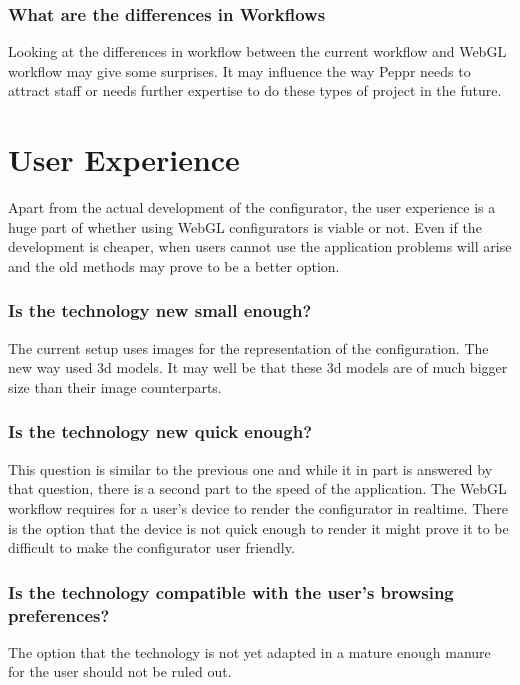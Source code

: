 \subsubsection {What are the differences in Workflows}
Looking at the differences in workflow between the current workflow and WebGL workflow may give some surprises. It may influence the way Peppr needs to attract staff or needs further expertise to do these types of project in the future.

\section{User Experience}
Apart from the actual development of the configurator, the user experience is a huge part of whether using WebGL configurators is viable or not. Even if the development is cheaper, when users cannot use the application problems will arise and the old methods may prove to be a better option.
\subsubsection {Is the technology new small enough?}
The current setup uses images for the representation of the configuration. The new way used 3d models. It may well be that these 3d models are of much bigger size than their image counterparts.

\subsubsection {Is the technology new quick enough?}
This question is similar to the previous one and while it in part is answered by that question, there is a second part to the speed of the application. The WebGL workflow requires for a user's device to render the configurator in realtime. There is the option that the device is not quick enough to render it might prove it to be difficult to make the configurator user friendly.

\subsubsection {Is the technology compatible with the user's browsing preferences?}
The option that the technology is not yet adapted in a mature enough manure for the user should not be ruled out.